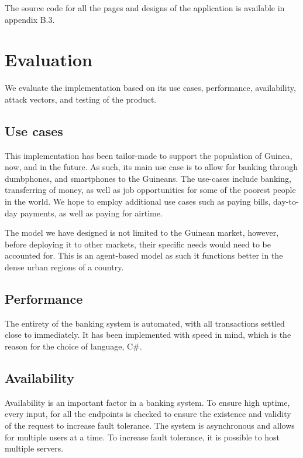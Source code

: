 \documentclass[11pt, a4paper]{article}
\begin{document}
The source code for all the pages and designs of the application is available in appendix B.3.


\section{Evaluation}
We evaluate the implementation based on its use cases, performance, availability, attack vectors, and testing of the product.
\subsection{Use cases} %
\label{sub:use_cases}
This implementation has been tailor-made to support the population of Guinea, now, and in the future. As such, its main use case is to allow for banking through dumbphones, and smartphones to the Guineans. The use-cases include banking, transferring of money, as well as job opportunities for some of the poorest people in the world. We hope to employ additional use cases such as paying bills, day-to-day payments, as well as paying for airtime.

The model we have designed is not limited to the Guinean market, however, before deploying it to other markets, their specific needs would need to be accounted for. This is an agent-based model
as such it functions better in the dense urban regions of a country.

\subsection{Performance} %
\label{sub:performance}
The entirety of the banking system is automated, with all transactions settled close to immediately. It has been implemented with speed in mind, which is the reason for the choice of language, C\#.

\subsection{Availability} %
\label{sub:availability}
Availability is an important factor in a banking system. To ensure high uptime, every input, for all the endpoints is checked to ensure the existence and validity of the request to increase fault tolerance. The system is asynchronous and allows for multiple users at a time. To increase fault tolerance, it is possible to host multiple servers.
\end{document}
